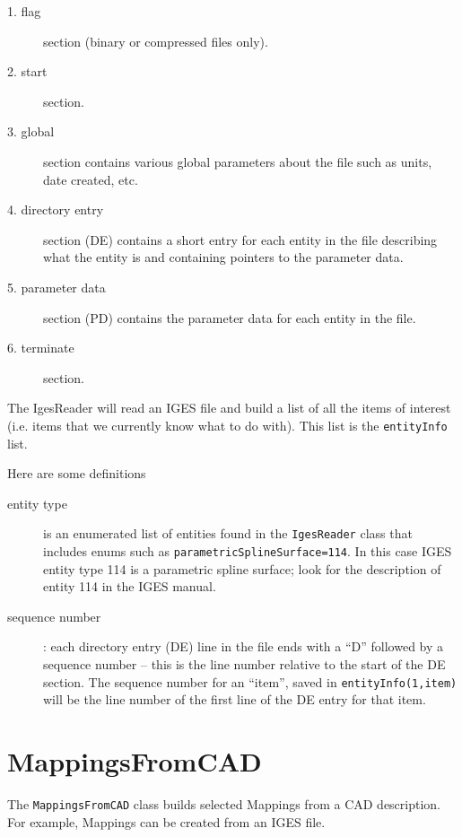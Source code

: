 \documentclass{article}
\begin{document}
\begin{description}
  \item[1. flag] section (binary or compressed files only).
  \item[2. start] section.
  \item[3. global] section contains various global parameters about the file such as units, date created, etc.
  \item[4. directory entry] section (DE) contains a short entry for each entity in the file describing what
     the entity is and containing pointers to the parameter data.
  \item[5. parameter data] section (PD) contains the parameter data for each entity in the file.
  \item[6. terminate] section.
\end{description}

The IgesReader will read an IGES file and build a list of all the items of interest (i.e. items
that we currently know what to do with). This list is the {\tt entityInfo} list.

Here are some definitions
\begin{description}
  \item[entity type] is an enumerated list of entities found in the {\tt IgesReader} class
   that includes enums such as {\tt parametric\-Spline\-Surface=114}. In this case IGES entity type
    114 is a parametric spline surface; look for the description of entity 114 in the IGES manual.
  \item[sequence number] : each directory entry (DE) line in the file ends with a ``D'' followed by
     a sequence number -- this is the line number relative to the start of the DE section.
     The sequence number for an ``item'', saved in {\tt entityInfo(1,item)}
      will be the line number of the first line of the DE entry
     for that item.
\end{description}         




\section{MappingsFromCAD}

 The {\tt MappingsFromCAD} class builds selected Mappings from a CAD description. For example,
Mappings can be created from an IGES file.



\vfill\eject



\printindex
\end{document}
